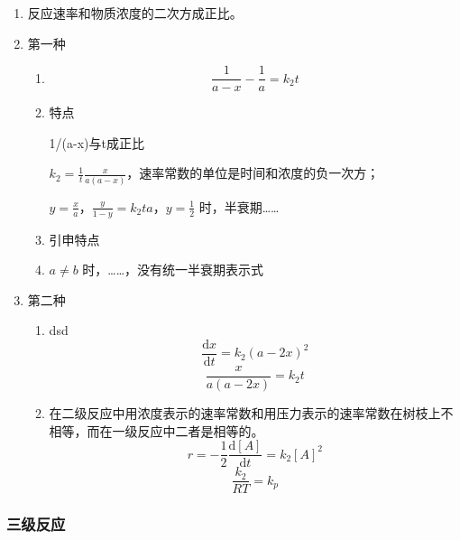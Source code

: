 \begin{enumerate}

    \item 反应速率和物质浓度的二次方成正比。
    \item 第一种
    \begin{enumerate}
        \item 
        \begin{equation}
            \frac1{a-x} - \frac1a = k_2 t 
        \end{equation}
        \item 特点
    
        1/(a-x)与t成正比

        $k_2 = \frac1t \frac{x}{a(a-x)}$，速率常数的单位是时间和浓度的负一次方；

        $y = \frac{x}{a}$，$\frac{y}{1-y} = k_2 t a$，$y = \frac12$ 时，半衰期……
        \item 引申特点
        \item $a \neq b$ 时，……，没有统一半衰期表示式
    \end{enumerate}
    \item 第二种
    \begin{enumerate}
        \item dsd
        \begin{equation}
            \frac{\mathrm{d}x}{\mathrm{d}t} = k_2 (a - 2x)^2
        \end{equation}
        \begin{equation}
            \frac{x}{a(a-2x)} = k_2 t
        \end{equation}
        \item 在二级反应中用浓度表示的速率常数和用压力表示的速率常数在树枝上不相等，而在一级反应中二者是相等的。
        \begin{equation}
            r = -\frac12 \frac{\mathrm{d}[A]}{\mathrm{d}t} = k_2 [A]^2
        \end{equation}
        \begin{equation}
            \frac{k_2}{RT} = k_p
        \end{equation}
    \end{enumerate}
\end{enumerate}



\subsubsection{三级反应}

